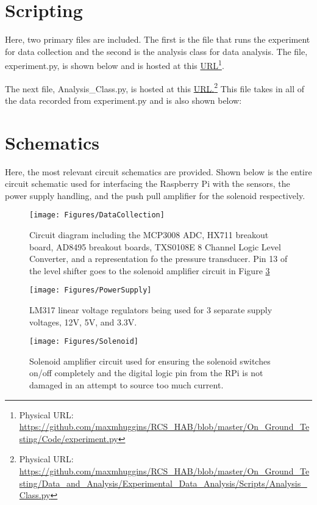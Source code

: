 \section{Scripting}\label{sec:Scripting}
Here, two primary files are included. The first is the file that runs the experiment for data collection and the second is the analysis class for data analysis. The file, experiment.py, is shown below and is hosted at this \href{https://github.com/maxmhuggins/RCS_HAB/blob/master/On_Ground_Testing/Code/experiment.py}{URL}\footnote{Physical URL: \url{https://github.com/maxmhuggins/RCS_HAB/blob/master/On_Ground_Testing/Code/experiment.py}}.

The next file, Analysis\_Class.py, is hosted at this \href{https://github.com/maxmhuggins/RCS_HAB/blob/master/On_Ground_Testing/Data_and_Analysis/Experimental_Data_Analysis/Scripts/Analysis_Class.py}{URL.}\footnote{Physical URL: \url{https://github.com/maxmhuggins/RCS_HAB/blob/master/On_Ground_Testing/Data_and_Analysis/Experimental_Data_Analysis/Scripts/Analysis_Class.py}} This file takes in all of the data recorded from experiment.py and is also shown below:

\section{Schematics}\label{sec:Schematics}
Here, the most relevant circuit schematics are provided. Shown below is the entire circuit schematic used for interfacing the Raspberry Pi with the sensors, the power supply handling, and the push pull amplifier for the solenoid respectively.
\begin{figure}[h!]
\centering
\texttt{[image: Figures/DataCollection]}
\caption{Circuit diagram including the MCP3008 ADC, HX711 breakout board, AD8495 breakout boards, TXS0108E 8 Channel Logic Level Converter, and a representation fo the pressure transducer. Pin 13 of the level shifter goes to the solenoid amplifier circuit in Figure \ref{fig:SolenoidSchem}}
\label{fig:DataCollectionSchem}
\end{figure}\clearpage
\begin{figure}[h!]
\centering
\texttt{[image: Figures/PowerSupply]}
\caption{LM317 linear voltage regulators being used for 3 separate supply voltages, 12V, 5V, and 3.3V.}
\label{fig:PowerSupplySchem}
\end{figure}
\begin{figure}[h!]
\centering
\texttt{[image: Figures/Solenoid]}
\caption{Solenoid amplifier circuit used for ensuring the solenoid switches on/off completely and the digital logic pin from the RPi is not damaged in an attempt to source too much current.}
\label{fig:SolenoidSchem}
\end{figure}\clearpage
